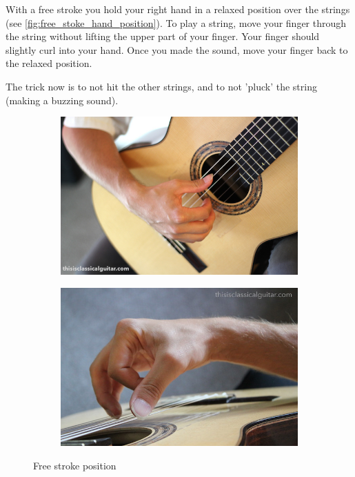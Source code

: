 With a free stroke you hold your right hand in a relaxed position over the strings (see \autoref{fig:free_stoke_hand_position}). To play a string, move your finger through the string without lifting the upper part of your finger. Your finger should slightly curl into your hand. Once you made the sound, move your finger back to the relaxed position.

The trick now is to not hit the other strings, and to not 'pluck' the string (making a buzzing sound).


\begin{figure}[h]
  \begin{subfigure}[b]{0.45\textwidth}
    \includegraphics[width=\textwidth]{../../Images/Bradford-right-hand-close-2016.jpg}
    \caption{}
    \label{fig:}
  \end{subfigure}
  \hfill
  \begin{subfigure}[b]{0.45\textwidth}
    \includegraphics[width=\textwidth]{../../Images/brad-right-stroke-2016.jpg}
    \caption{}
    \label{fig:}
  \end{subfigure}
  \caption{Free stroke position \cite{FreeStrokePositionBradlyWerner}}
  \label{fig:free_stoke_hand_position}
\end{figure}

